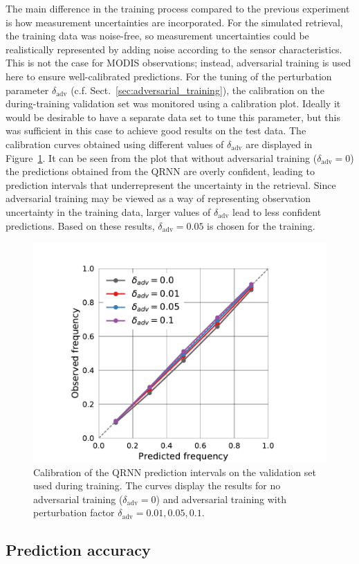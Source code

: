 \documentclass[journal abbreviation, manuscript]{copernicus}
\begin{document}
The main difference in the training process compared to the previous experiment
is how measurement uncertainties are incorporated. For the simulated retrieval,
the training data was noise-free, so measurement uncertainties could be
realistically represented by adding noise according to the sensor
characteristics. This is not the case for MODIS observations; instead,
adversarial training is used here to ensure well-calibrated predictions. For the
tuning of the perturbation parameter $\delta_{\text{adv}}$ (c.f.
Sect.~\ref{sec:adversarial_training}), the calibration on the during-training
validation set was monitored using a calibration plot. Ideally it would be
desirable to have a separate data set to tune this parameter, but this was
sufficient in this case to achieve good results on the test data. The calibration curves
obtained using different values of $\delta_\text{adv}$ are displayed in
Figure~\ref{fig:validation_calibration}. It can be seen from the plot that
without adversarial training ($\delta_\text{adv} = 0$) the predictions obtained
from the QRNN are overly confident, leading to prediction intervals that
underrepresent the uncertainty in the retrieval. Since adversarial training may
be viewed as a way of representing observation uncertainty in the training data,
larger values of $\delta_\text{adv}$ lead to less confident predictions. Based
on these results, $\delta_\text{adv} = 0.05$ is chosen for the training.

  \begin{figure}[hbpt!]
    \centering
    \includegraphics[width = 0.4\linewidth]{../plots/fig07}
    \caption{Calibration of the QRNN prediction intervals on the validation set
      used during training. The curves display the results for no adversarial training
      ($\delta_\text{adv} = 0$) and adversarial training with perturbation
      factor $\delta_\text{adv} = 0.01, 0.05, 0.1$.}
    \label{fig:validation_calibration}
  \end{figure}


\subsection{Prediction accuracy}
\end{document}
